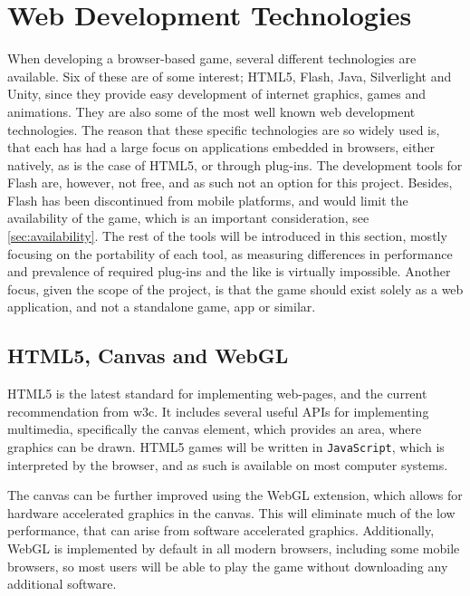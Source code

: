 \section{Web Development Technologies}
\label{sec:tools}
When developing a browser-based game, several different technologies are available.
Six of these are of some interest; HTML5, Flash, Java, Silverlight and Unity, since they provide easy development of internet graphics, games and animations.
They are also some of the most well known web development technologies.
The reason that these specific technologies are so widely used is, that each has had a large focus on applications embedded in browsers, either natively, as is the case of HTML5, or through plug-ins.
The development tools for Flash are, however, not free, and as such not an option for this project.\cite{adobe13}
Besides, Flash has been discontinued from mobile platforms,\cite{adobe12} and would limit the availability of the game, which is an important consideration, see \autoref{sec:availability}.
The rest of the tools will be introduced in this section, mostly focusing on the portability of each tool, as measuring differences in performance and prevalence of required plug-ins and the like is virtually impossible.
Another focus, given the scope of the project, is that the game should exist solely as a web application, and not a standalone game, app or similar.

\subsection{HTML5, Canvas and WebGL}
HTML5 is the latest standard for implementing web-pages, and the current recommendation from \ac{w3c}.\cite{html513}
It includes several useful APIs for implementing multimedia, specifically the canvas element, which provides an area, where graphics can be drawn.
HTML5 games will be written in \texttt{JavaScript}, which is interpreted by the browser, and as such is available on most computer systems.\newline

The canvas can be further improved using the WebGL extension, which allows for hardware accelerated graphics in the canvas.\cite{khronos13}
This will eliminate much of the low performance, that can arise from software accelerated graphics.
Additionally, WebGL is implemented by default in all modern browsers, including some mobile browsers, so most users will be able to play the game without downloading any additional software.


